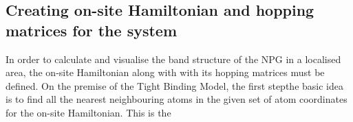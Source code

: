 \subsection{Creating on-site Hamiltonian and hopping matrices for the system}
In order to calculate and visualise the band structure of the NPG in a localised area, the on-site Hamiltonian along with with its hopping matrices must be defined. On the premise of the Tight Binding Model, the first stepthe basic idea is to find all the nearest neighbouring atoms in the given set of atom coordinates for the on-site Hamiltonian. This is the  
